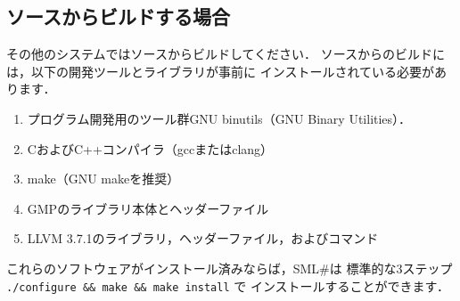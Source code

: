 \documentclass{jbook}
\newif\ifjp
\newcommand{\txt}[2]{#1}
\newcommand{\smlsharp}{SML\#}
\newenvironment{program}{\begin{quote}\begin{tt}}%
                        {\end{tt}\end{quote}}
\begin{document}
%
%
%
%
%

\subsection{\txt{ソースからビルドする場合}{Building from the source}}
\ifjp%
	その他のシステムではソースからビルドしてください．
	ソースからのビルドには，以下の開発ツールとライブラリが事前に
インストールされている必要があります．
\begin{enumerate}
\item プログラム開発用のツール群GNU binutils（GNU Binary Utilities）．
\item CおよびC++コンパイラ（gccまたはclang）
\item make（GNU makeを推奨）
\item GMPのライブラリ本体とヘッダーファイル
\item LLVM 3.7.1のライブラリ，ヘッダーファイル，およびコマンド
\end{enumerate}
	これらのソフトウェアがインストール済みならば，\smlsharp{}は
標準的な3ステップ {\tt ./configure \&\& make \&\& make install} で
インストールすることができます．
\end{document}
